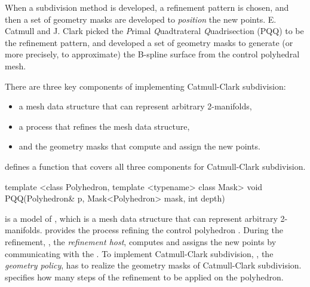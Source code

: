When a subdivision method is developed, a refinement pattern is 
chosen, and then a set of geometry masks are developed to 
\emph{position} the new points.
E. Catmull and J. Clark picked the \emph{P}rimal \emph{Q}uadtrateral 
\emph{Q}uadrisection (PQQ) to be the refinement pattern,
and developed a set of geometry masks to generate (or more precisely, 
to approximate) the B-spline surface from the control polyhedral 
mesh. 

There are three key components of implementing
Catmull-Clark subdivision: 
\begin{itemize}
\item
a mesh data structure that can represent arbitrary 2-manifolds, 
\item
a process that refines the mesh data structure, 
\item
and the geometry masks that compute and assign the new points.
\end{itemize}

 defines a function that covers all 
three components for Catmull-Clark subdivision.

\begin{ccExampleCode}
template <class Polyhedron, template <typename> class Mask>
void PQQ(Polyhedron& p, Mask<Polyhedron> mask, int depth)
\end{ccExampleCode}

 is a model of , which
is a mesh data structure that can represent arbitrary 
2-manifolds.  provides the process refining 
the control polyhedron . During the refinement, 
, the \emph{refinement host}, computes and assigns the 
new points by communicating with the . 
To implement Catmull-Clark subdivision,
, the \emph{geometry policy}, has to realize the geometry 
masks of Catmull-Clark subdivision. 
 specifies how many steps of the refinement 
to be applied on the polyhedron. 

